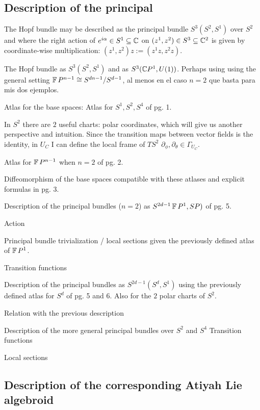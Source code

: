         
\subsection{Description of the principal}

The Hopf bundle may be described as the principal bundle $S^3(S^2, S^1)$ over $S^2$ and where the right action of $e^{i \alpha} \in S^1 \subseteq \mathbb{C}$ on $(z^1, z^2) \in S^3 \subseteq \mathbb{C}^2$ is given by coordinate-wise multiplication: $(z^1, z^2) z := (z^1 z, z^2 z)$. 

The Hopf bundle as $S^3(S^2, S^1)$ and as $S^3(\mathbb{C} P^1, U(1))$. Perhaps using using the general setting $\operatorname{\mathbb{F}} P^{n-1} \cong S^{dn-1}/S^{d-1}$, al menos en el caso $n = 2$ que basta para mis dos ejemplos.

Atlas for the base spaces:
    Atlas for $S^1, S^2, S^4$ of pg. 1. 
    
        In $S^2$ there are $2$ useful charts: polar coordinates, which will give us another perspective and intuition. Since the transition maps between vector fields is the identity, in $U_C$ I can define the local frame of $TS^2$ $\partial_\phi, \partial_\theta \in \Gamma_{U_C}$.
    
    Atlas for $\operatorname{\mathbb{F}} P^{n-1}$ when $n = 2$ of pg. 2.

Diffeomorphism of the base spaces compatible with these atlases and explicit formulas in pg. 3.

Description of the principal bundles ($n = 2$) as $S^{2d - 1}\operatorname{\mathbb{F}} P^1, SP)$ of pg. 5.

    Action
    
    Principal bundle trivialization / local sections given the previously defined atlas of $\operatorname{\mathbb{F}} P^1$.
    
    Transition functions
    
Description of the principal bundles as $S^{2d-1}(S^d, S^1)$ using the previously defined atlas for $S^d$ of pg. 5 and 6.
    Also for the $2$ polar charts of $S^2$.
    
    Relation with the previous description

Description of the more general principal bundles over $S^2$ and $S^4$
    Transition functions
    
    Local sections

\subsection{Description of the corresponding Atiyah Lie algebroid}

